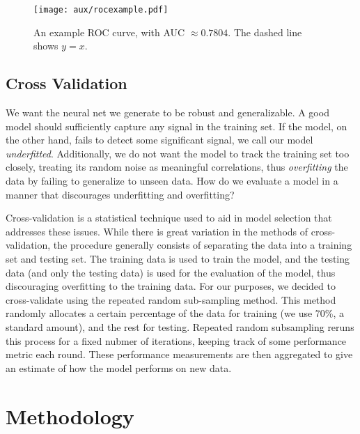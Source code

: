 \documentclass[10pt]{article}
\begin{document}
\begin{figure}
\centering
\texttt{[image: aux/rocexample.pdf]}
\caption{An example ROC curve, with AUC $\approx 0.7804$. The dashed line shows $y = x$.}
\label{fig:rocexample}
\end{figure}

\subsection{Cross Validation}

We want the neural net we generate to be robust and generalizable.
A good model should sufficiently capture any signal in the training set.
If the model, on the other hand, fails to detect some significant signal, we call our model \emph{underfitted}.
Additionally, we do not want the model to track the training set too closely, treating its random noise as meaningful correlations, thus \emph{overfitting} the data by failing to generalize to unseen data.
How do we evaluate a model in a manner that discourages underfitting and overfitting?


Cross-validation is a statistical technique used to aid in model selection that addresses these issues.
While there is great variation in the methods of cross-validation, the procedure generally consists of separating the data into a training set and testing set.
The training data is used to train the model, and the testing data (and only the testing data) is used for the evaluation of the model, thus discouraging overfitting to the training data.
For our purposes, we decided to cross-validate using the repeated random sub-sampling method.
This method randomly allocates a certain percentage of the data for training (we use 70\%, a standard amount), and the rest for testing.
Repeated random subsampling reruns this process for a fixed nubmer of iterations, keeping track of some performance metric each round.
These performance measurements are then aggregated to give an estimate of how the model performs on new data.


%


\section{Methodology}
\end{document}
